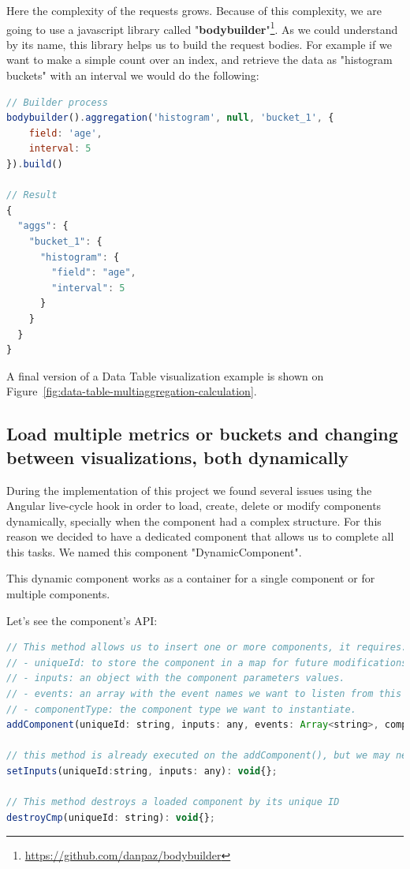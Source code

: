 \documentclass[a4paper, 12pt, english]{book}
\begin{document}
Here the complexity of the requests grows. Because of this complexity, we are going to use a javascript library called "\textbf{bodybuilder}"\footnote{\url{https://github.com/danpaz/bodybuilder}}. As we could understand by its name, this library helps us to build the request bodies. For example if we want to make a simple count over an index, and retrieve the data as "histogram buckets" with an interval we would do the following:
\begin{lstlisting}[language=javascript]
// Builder process
bodybuilder().aggregation('histogram', null, 'bucket_1', {
  	field: 'age',
	interval: 5
}).build()

// Result
{
  "aggs": {
    "bucket_1": {
      "histogram": {
        "field": "age",
        "interval": 5
      }
    }
  }
}
\end{lstlisting}

A final version of a Data Table visualization example is shown on Figure~\ref{fig:data-table-multiaggregation-calculation}.

\subsection{Load multiple metrics or buckets and changing between visualizations, both dynamically}
\label{sec:loading-dynamically}
During the implementation of this project we found several issues using the Angular live-cycle hook in order to load, create, delete or modify components dynamically, specially when the component had a complex structure. For this reason we decided to have a dedicated component that allows us to complete all this tasks. We named this component "DynamicComponent".

This dynamic component works as a container for a single component or for multiple components.

Let's see the component's API:
\begin{lstlisting}[language=javascript]
// This method allows us to insert one or more components, it requires:
// - uniqueId: to store the component in a map for future modifications or access.
// - inputs: an object with the component parameters values.
// - events: an array with the event names we want to listen from this component.
// - componentType: the component type we want to instantiate.
addComponent(uniqueId: string, inputs: any, events: Array<string>, componentType: any): any{};

// this method is already executed on the addComponent(), but we may need it after the component initialization to modify some component parameter
setInputs(uniqueId:string, inputs: any): void{};

// This method destroys a loaded component by its unique ID
destroyCmp(uniqueId: string): void{};
\end{lstlisting}
\end{document}

